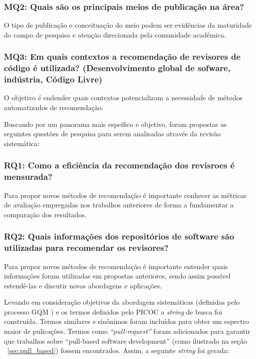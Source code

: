 \documentclass[12pt,openany,oneside,a4paper,english,brazil]{abntbibufjf}
\begin{document}
\subsubsection{\textbf{MQ2: Quais são os principais meios de publicação na área?}} O tipo de publicação e conceituação do meio podem ser evidências da maturidade do campo de pesquisa e atenção direcionada pela comunidade acadêmica.

\subsubsection{\textbf{MQ3: Em quais contextos a recomendação de revisores de código é utilizada? (Desenvolvimento global de sofware, indústria, Código Livre)}} O objetivo é endender quais contextos potencializam a necessidade de métodos automatizados de recomendação.

Buscando por um panorama mais espeífico e objetivo, foram propostas as seguintes questões de pesquisa para serem analisadas através da revisão sistemática:

\subsubsection{\textbf{RQ1: Como a eficiência da recomendação dos revisroes é mensurada?}} Para propor novos métodos de recomendação é importante conhecer as métricas de avaliação empregadas nos trabalhos anteriores de forma a fundamentar a comparação dos resultados.

\subsubsection{\textbf{RQ2: Quais informações dos repositórios de software são utilizadas para recomendar os revisores?}} Para propor novos métodos de recomendação é importante entender quais informações foram utilizadas em propostas anteriores, sendo assim possível estendê-las e discutir novas abordagens e aplicações.

Levando em consideração objetivos da abordagem sistemáticas (definidas pelo processo GQM \cite{Basili1984}) e os termos definidos pelo PICOC \cite{Petticrew2008} a \textit{string} de busca foi construída. Termos similares e sinônimos foram incluídos para obter um espectro maior de pulicações. Termos como \textit{``pull-request''} foram adicionados para garantir que trabalhos sobre ``pull-based software development'' (como ilustrado na seção ~\ref{sec:pull_based}) fossem encontrados. Assim, a seguinte \textit{string} foi gerada:
\end{document}
